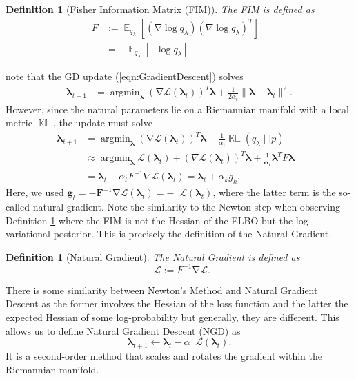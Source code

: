 \documentclass[a4paper, 11pt, oneside]{scrartcl}
\theoremstyle{break}
\newtheorem{definition}[lemma]{Definition}
\DeclareMathOperator*{\argmin}{argmin}
\DeclareMathOperator{\Expect}{\mathbb{E}}
\DeclareMathOperator{\grad}{\nabla}
\DeclareMathOperator{\ngrad}{\tilde{\nabla}}
\DeclareMathOperator{\Hessian}{\nabla^2}
\DeclareMathOperator{\KL}{\mathbb{KL}}
\newcommand{\matr}[1]{\boldsymbol{#1}}
\numberwithin{equation}{section}
\begin{document}
			\begin{definition}[Fisher Information Matrix (FIM)]
				\label{def:FIM}
				The FIM is defined as 
				\begin{align*}
					F &:= \Expect_{q_{\lambda}}\left[(\grad \log q_{\lambda}) (\nabla \log q_{\lambda})^T\right] &\\
				  	  &= -\Expect_{q_{\lambda}}\left[ \Hessian \log q_{\lambda} \right]
				\end{align*}
			\end{definition}
			\cite{KR21} note that the GD update (\ref{eqn:GradientDescent}) solves
			\begin{align*}
				\matr{\lambda}_{t+1} &= \argmin_{\matr{\lambda}} (\grad \mathcal{L}(\matr{\lambda}_t))^T \matr{\lambda} + \frac{1}{2\alpha_t} \|\matr{\lambda} - \matr{\lambda}_t\|^2.
			\end{align*}
			However, since the natural parameters lie on a Riemannian manifold with a local metric $\KL$, the update must solve
			\begin{align*}
				\matr{\lambda}_{t+1} &= \argmin_{\matr{\lambda}} (\grad \mathcal{L}(\matr{\lambda}_t))^T \matr{\lambda} + \frac{1}{\alpha_t} \KL (q_{\lambda} \mid\mid p) &\\
				&\approx \argmin_{\matr{\lambda}} \mathcal{L}(\matr{\lambda}_t) + (\nabla \mathcal{L}(\matr{\lambda}_t))^T \matr{\lambda} + \frac{1}{\matr{\alpha}_t} \matr{\lambda}^T F \matr{\lambda} &\\
				&= \matr{\lambda}_t -\alpha_t F^{-1} \nabla \mathcal{L}(\matr{\lambda}_t) = \matr{\lambda}_t + \alpha_k g_k.
			\end{align*}
			Here, we used $\matr{g}_t = -\matr{F}^{-1} \grad \mathcal{L}(\matr{\lambda}_t) = -\ngrad \mathcal{L}(\matr{\lambda}_t)$, where the latter term is the so-called natural gradient.
			Note the similarity to the Newton step when observing Definition \ref{def:FIM} where the FIM is not the Hessian of the ELBO but the log variational posterior.
			This is precisely the definition of the Natural Gradient.
			\begin{definition}[Natural Gradient]
				\label{def:NaturalGradient}
				The Natural Gradient \parencite{A16} is defined as 
				\begin{equation}
					\ngrad \mathcal{L} := F^{-1} \grad \mathcal{L}.
					\label{eqn:NaturalGradient}
				\end{equation}
			\end{definition}

			There is some similarity between Newton's Method and Natural Gradient Descent as the former involves the Hessian of the loss function and the latter the expected Hessian of some log-probability but generally, they are different. 
			This allows us to define Natural Gradient Descent (NGD) \parencite{A16} as 
			\begin{equation}
				\matr{\lambda}_{t+1} \leftarrow \matr{\lambda}_t - \alpha \ngrad \mathcal{L} (\matr{\lambda}_t).
				\label{eqn:NGD}
			\end{equation}
			It is a second-order method that scales and rotates the gradient within the Riemannian manifold. 
\end{document}
